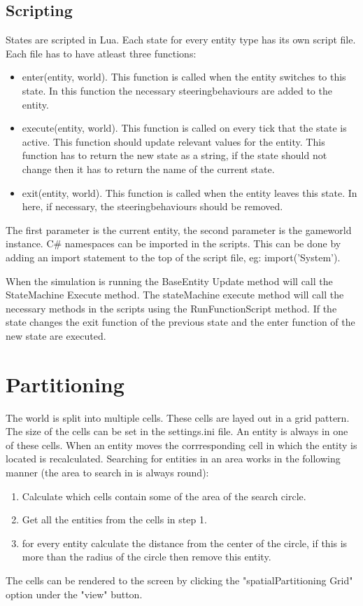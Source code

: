 \documentclass{article}
\begin{document}
   \subsection {Scripting}
   States are scripted in Lua. Each state for every entity type has its own script file. Each file has to have atleast three functions: 
   \begin{itemize}
   \item enter(entity, world). This function is called when the entity switches to this state. In this function the necessary steeringbehaviours are added to the entity.
   \item execute(entity, world). This function is called on every tick that the state is active. This function should update relevant values for the entity. This function has to return the new state as a string, if the state should not change then it has to return the name of the current state.
   \item exit(entity, world). This function is called when the entity leaves this state. In here, if necessary, the steeringbehaviours should be removed.
   \end{itemize}
   The first parameter is the current entity, the second parameter is the gameworld instance. C\# namespaces can be imported in the scripts. This can be done by adding an import statement to the top of the script file, eg: import('System').
   
   When the simulation is running the BaseEntity Update method will call the StateMachine Execute method. The stateMachine execute method will call the necessary methods in the scripts using the RunFunctionScript method. If the state changes the exit function of the previous state and the enter function of the new state are executed.
   
   \newpage
   \section {Partitioning}
   The world is split into multiple cells. These cells are layed out in a grid pattern. The size of the cells can be set in the settings.ini file. An entity is always in one of these cells. When an entity moves the corrresponding cell in which the entity is located is recalculated. Searching for entities in an area works in the following manner (the area to search in is always round):
   \begin{enumerate}
   \item Calculate which cells contain some of the area of the search circle.
   \item Get all the entities from the cells in step 1.
   \item for every entity calculate the distance from the center of the circle, if this is more than the radius of the circle then remove this entity.
   \end{enumerate}
   The cells can be rendered to the screen by clicking the "spatialPartitioning Grid" option under the "view" button. 
\end{document}
